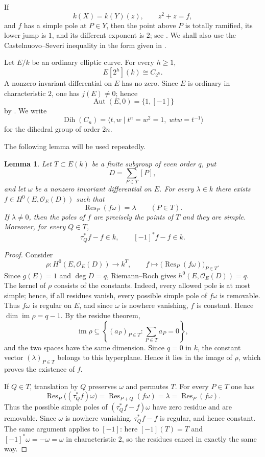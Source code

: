 \documentclass[11pt]{article}
\newtheorem{lemma}[theorem]{Lemma}
\theoremstyle{remark}
\newcommand{\Aut}{\operatorname{Aut}}
\newcommand{\Res}{\operatorname{Res}}
\newcommand{\Dih}{\operatorname{Dih}}
\begin{document}
If
\[
        k(X)=k(Y)(z),\qquad z^2+z=f,
\]
and $f$ has a simple pole at $P\in Y$, then the point above $P$ is
totally ramified, its lower jump is $1$, and its different exponent is
$2$; see \cite[Proposition~III.7.8]{Stichtenoth}.  We shall also use the
Castelnuovo--Severi inequality in the form given in
\cite[Theorem~III.10.3]{Stichtenoth}.

Let $E/k$ be an ordinary elliptic curve.  For every $h\ge1$,
\[
        E[2^h](k)\cong C_{2^h}.
\]
A nonzero invariant differential on $E$ has no zero.  Since $E$ is
ordinary in characteristic $2$, one has $j(E)\ne0$; hence
\[
        \Aut(E,0)=\{1,[-1]\}
\]
by \cite[Theorem~III.10.1]{Silverman}.  We write
\[
        \Dih(C_n)=\langle t,w\mid t^n=w^2=1,\;wtw=t^{-1}\rangle
\]
for the dihedral group of order $2n$.

The following lemma will be used repeatedly.

\begin{lemma}\label{lem:principalparts}
Let $T\subset E(k)$ be a finite subgroup of even order $q$, put
\[
        D=\sum_{P\in T}[P],
\]
and let $\omega$ be a nonzero invariant differential on $E$.  For every
$\lambda\in k$ there exists $f\in H^0(E,\mathcal O_E(D))$ such that
\[
        \Res_P(f\omega)=\lambda\qquad(P\in T).
\]
If $\lambda\ne0$, then the poles of $f$ are precisely the points of $T$
and they are simple.  Moreover, for every $Q\in T$,
\[
        \tau_Q^*f-f\in k,\qquad [-1]^*f-f\in k.
\]
\end{lemma}

\begin{proof}
Consider
\[
 \rho:H^0(E,\mathcal O_E(D))\longrightarrow k^T,\qquad
 f\longmapsto\bigl(\Res_P(f\omega)\bigr)_{P\in T}.
\]
Since $g(E)=1$ and $\deg D=q$, Riemann--Roch gives
$h^0(E,\mathcal O_E(D))=q$.  The kernel of $\rho$ consists of the
constants.  Indeed, every allowed pole is at most simple; hence, if all
residues vanish, every possible simple pole of $f\omega$ is removable.
Thus $f\omega$ is regular on $E$, and since $\omega$ is nowhere
vanishing, $f$ is constant.  Hence
$\dim\operatorname{im}\rho=q-1$.  By the residue theorem,
\[
 \operatorname{im}\rho
 \subseteq\left\{(a_P)_{P\in T}:\sum_{P\in T}a_P=0\right\},
\]
and the two spaces have the same dimension.  Since $q=0$ in $k$, the
constant vector $(\lambda)_{P\in T}$ belongs to this hyperplane.  Hence it
lies in the image of $\rho$, which proves the existence of $f$.

If $Q\in T$, translation by $Q$ preserves $\omega$ and permutes $T$.
For every $P\in T$ one has
\[
 \Res_P\bigl((\tau_Q^*f)\omega\bigr)
 =\Res_{P+Q}(f\omega)=\lambda=\Res_P(f\omega).
\]
Thus the possible simple poles of $(\tau_Q^*f-f)\omega$ have zero
residue and are removable.  Since $\omega$ is nowhere vanishing,
$\tau_Q^*f-f$ is regular, and hence constant.  The same argument applies
to $[-1]$: here $[-1](T)=T$ and $[-1]^*\omega=-\omega=\omega$ in
characteristic $2$, so the residues cancel in exactly the same way.
\end{proof}
\end{document}
